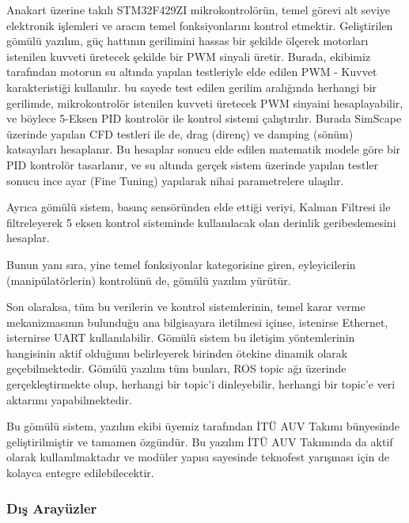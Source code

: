 \documentclass[12pt]{article}
\newcounter{subsubsubsection}[subsubsection]
\begin{document}

Anakart üzerine takılı STM32F429ZI mikrokontrolörün, temel görevi alt seviye elektronik işlemleri ve aracın temel fonksiyonlarını kontrol etmektir. Geliştirilen gömülü yazılım, güç hattının gerilimini hassas bir şekilde ölçerek motorları istenilen kuvveti üretecek şekilde bir PWM sinyali üretir. Burada, ekibimiz tarafından motorun su altında yapılan testleriyle elde edilen PWM - Kuvvet karakteristiği kullanılır. bu sayede test edilen gerilim aralığında herhangi bir gerilimde, mikrokontrolör istenilen kuvveti üretecek PWM sinyaini hesaplayabilir, ve böylece 5-Eksen PID kontrolör ile kontrol sistemi çalıştırılır. Burada SimScape üzerinde yapılan CFD testleri ile de, drag (direnç) ve damping (sönüm) katsayıları hesaplanır. Bu hesaplar sonucu elde edilen matematik modele göre bir PID kontrolör tasarlanır, ve su altında gerçek sistem üzerinde yapılan testler sonucu ince ayar (Fine Tuning) yapılarak nihai parametrelere ulaşılır. 

Ayrıca gömülü sistem, basınç sensöründen elde ettiği veriyi, Kalman Filtresi ile filtreleyerek 5 eksen kontrol sisteminde kullanılacak olan derinlik geribeslemesini hesaplar.

Bunun yanı sıra, yine temel fonksiyonlar kategorisine giren, eyleyicilerin (manipülatörlerin) kontrolünü de, gömülü yazılım yürütür.

Son olaraksa, tüm bu verilerin ve kontrol sistemlerinin, temel karar verme mekanizmasının bulunduğu ana bilgisayara iletilmesi içinse, istenirse Ethernet, isternirse UART kullanılabilir. Gömülü sistem bu iletişim yöntemlerinin hangisinin aktif olduğunu belirleyerek birinden ötekine dinamik olarak geçebilmektedir. Gömülü yazılım tüm bunları, ROS topic ağı üzerinde gerçekleştirmekte olup, herhangi bir topic'i dinleyebilir, herhangi bir topic'e veri aktarımı yapabilmektedir. 

Bu gömülü sistem, yazılım ekibi üyemiz tarafından İTÜ AUV Takımı bünyesinde geliştirilmiştir ve tamamen özgündür. Bu yazılım İTÜ AUV Takımında da aktif olarak kullanılmaktadır ve modüler yapısı sayesinde teknofest yarışması için de kolayca entegre edilebilecektir.  





\subsubsection{Dış Arayüzler}
\end{document}
